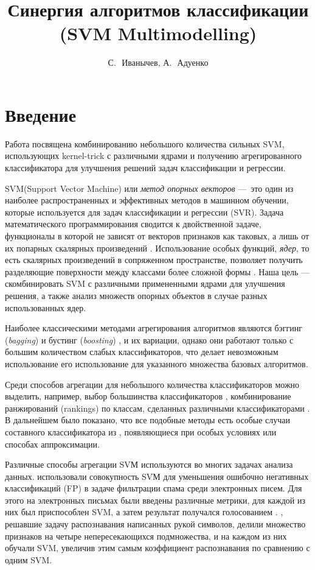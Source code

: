 \documentclass[12pt,twoside]{article}
\title
    {Синергия алгоритмов классификации (SVM Multimodelling)}
\author
    {С.\,~Иванычев, А.\,~Адуенко}
\begin{document}
\maketitle

\section{Введение}
Работа посвящена комбинированию небольшого количества сильных SVM, использующих kernel-trick с различными ядрами и получению агрегированного классификатора для улучшения решений задач классификации и регрессии. 

    SVM(Support Vector Machine) или \emph{метод опорных векторов}\cite{Vapnik1998, Cortes1995, Boser1992} ---~это один из наиболее распространенных и эффективных методов в машинном обучении, которые используется для задач классификации и регрессии (SVR). Задача математического программирования сводится к двойственной задаче, функционалы в которой не зависят от векторов признаков как таковых, а лишь от их попарных скалярных произведений \cite{Voron} . Использование особых функций, \emph{ядер}, то есть скалярных произведений в сопряженном пространстве, позволяет получить разделяющие поверхности между классами более сложной формы \cite{Smola2004}. Наша цель --- скомбинировать SVM
    с различными примененными ядрами для улучшения решения, а также анализ множеств опорных объектов в случае разных использованных ядер.
    
    Наиболее классическими методами агрегирования алгоритмов являются 
    бэггинг (\emph{bagging})\cite{Breiman1996} и бустинг (\emph{boosting}) \cite{Freund1995}, и их
    вариации, однако они работают только с  большим количеством слабых классификаторов, что делает невозможным использование его использование для указанного множества базовых алгоритмов.
    
    Среди способов агрегации для небольшого количества классификаторов можно
    выделить, например, выбор большинства классификаторов \cite{Franke1992}, 
    комбинирование ранжирований (rankings) по классам, сделанных различными
    классификаторами \cite{Ho1994}. В дальнейшем было показано, что все подобные 
    методы есть особые случаи составного классификатора из \cite{Kittler1996}, 
    появляющиеся при особых условиях или способах аппроксимации.
    
    Различные способы агрегации SVМ используются во многих задачах анализа данных. 
    \cite{Martin-merino2007} использовали совокупность SVМ для уменьшения ошибочно негативных классификаций (FP) в задаче фильтрации спама среди электронных писем. 
    Для этого на электронных письмах были введены различные метрики, для каждой из них был приспособлен SVM, а затем результат получался голосованием \cite{Kittler1996}. 
    \cite{Gorgevik2005}, решавшие задачу распознавания написанных рукой символов, делили множество признаков на четыре непересекающихся подмножества, и на каждом из них обучали SVM, увеличив этим самым коэффициент распознавания по сравнению с одним SVM.
    
\end{document}
